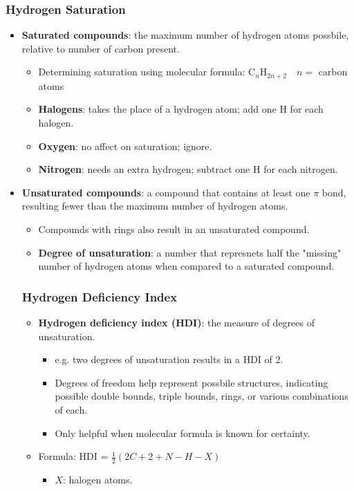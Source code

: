 \documentclass[12pt,a4paper]{article}
\begin{document}
\subsubsection{Hydrogen Saturation}
\begin{itemize}
    \item \textbf{Saturated compounds}: the maximum number of hydrogen atoms possbile, relative to number of carbon present.
        \begin{itemize}
            \item Determining saturation using molecular formula: {\color{o-Sun}C\(_{n}\)H\(_{2n+2}\)}~~\(n=\) carbon atoms
        \end{itemize}
            \begin{itemize}
                \item \textbf{Halogens}: takes the place of a hydrogen atom; {\color{o-Sun}add one H} for each halogen.
                \item \textbf{Oxygen}: no affect on saturation; {\color{o-Sun}ignore}.
                \item \textbf{Nitrogen}: needs an extra hydrogen; {\color{o-Sun}subtract one H} for each nitrogen. 
            \end{itemize}
    \item \textbf{Unsaturated compounds}: a compound that contains at least one $\pi$ bond, resulting fewer than the maximum number of hydrogen atoms.
        \begin{itemize}
            \item Compounds with rings also result in an unsaturated compound.
            \item \textbf{Degree of unsaturation}: a number that represnets {\color{o-Sun}half} the {\color{o-Sun}"missing"} number of hydrogen atoms when compared to a saturated compound.
        \end{itemize}
    \subsubsection{Hydrogen Deficiency Index}
    \begin{itemize}
    \item \textbf{Hydrogen deficiency index (HDI)}: the measure of degrees of unsaturation. 
        \begin{itemize}
            \item e.g. two degrees of unsaturation results in a HDI of 2.
            \item Degrees of freedom help represent possbile structures, indicating possible double bounds, triple bounds, rings, or various combinations of each.
            \item Only helpful when molecular formula is known for certainty.
        \end{itemize}
    \item Formula: {\color{o-Sun}HDI = \(\frac{1}{2}(2C + 2 + N - H - X)\)}
        \begin{itemize}
                \item \(X\): halogen atoms.
        \end{itemize}
    \end{itemize}
\end{itemize}
\end{document}
